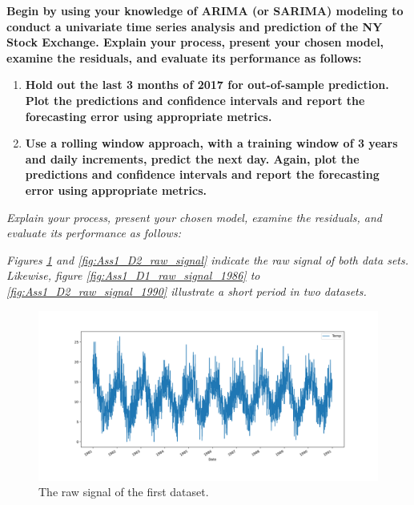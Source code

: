 \item \textbf{Begin by using your knowledge of ARIMA (or SARIMA) modeling to conduct a univariate time series analysis and prediction of the NY Stock Exchange. Explain your process, present your chosen model, examine the residuals, and evaluate its performance as follows:} 
\begin{enumerate}
\item \textbf{Hold out the last 3 months of 2017 for out-of-sample prediction. Plot the predictions and confidence intervals and report the forecasting error using appropriate metrics.}
\item \textbf{Use a rolling window approach, with a training window of 3 years and daily increments, predict the next day. Again, plot the predictions and confidence intervals and report the forecasting error using appropriate metrics.}
\end{enumerate}





\textit{Explain your process,
present your chosen model, 
examine the residuals, 
and evaluate its performance as follows:
}

\textit{Figures \ref{fig:Ass1_D1_raw_signal} and \ref{fig:Ass1_D2_raw_signal} indicate the raw signal of both data sets. Likewise, figure \ref{fig:Ass1_D1_raw_signal_1986} to  \ref{fig:Ass1_D2_raw_signal_1990} illustrate a short period in two datasets. }

\begin{figure}[H]
    \centering
    \begin{minipage}[b]{1\textwidth}
        \includegraphics[width=\textwidth]{figures/Ass1/Ass1_D1_raw_signal.png}
    \end{minipage}
    \caption{The raw signal of the first dataset.}
    \label{fig:Ass1_D1_raw_signal}
\end{figure}


